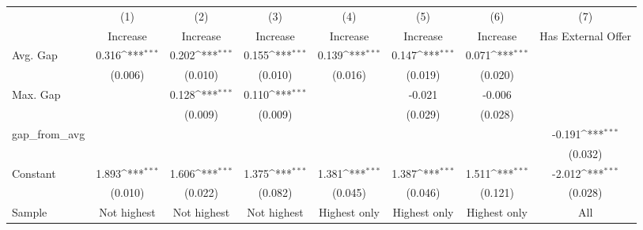 {
\def\sym#1{\ifmmode^{#1}\else\(^{#1}\)\fi}
\begin{tabular}{l*{7}{c}}
\hline\hline
                    &\multicolumn{1}{c}{(1)}&\multicolumn{1}{c}{(2)}&\multicolumn{1}{c}{(3)}&\multicolumn{1}{c}{(4)}&\multicolumn{1}{c}{(5)}&\multicolumn{1}{c}{(6)}&\multicolumn{1}{c}{(7)}\\
                    &\multicolumn{1}{c}{Increase}&\multicolumn{1}{c}{Increase}&\multicolumn{1}{c}{Increase}&\multicolumn{1}{c}{Increase}&\multicolumn{1}{c}{Increase}&\multicolumn{1}{c}{Increase}&\multicolumn{1}{c}{Has External Offer}\\
\hline
Avg. Gap            &       0.316\sym{***}&       0.202\sym{***}&       0.155\sym{***}&       0.139\sym{***}&       0.147\sym{***}&       0.071\sym{***}&                     \\
                    &     (0.006)         &     (0.010)         &     (0.010)         &     (0.016)         &     (0.019)         &     (0.020)         &                     \\
[1em]
Max. Gap            &                     &       0.128\sym{***}&       0.110\sym{***}&                     &      -0.021         &      -0.006         &                     \\
                    &                     &     (0.009)         &     (0.009)         &                     &     (0.029)         &     (0.028)         &                     \\
[1em]
gap\_from\_avg        &                     &                     &                     &                     &                     &                     &      -0.191\sym{***}\\
                    &                     &                     &                     &                     &                     &                     &     (0.032)         \\
[1em]
Constant            &       1.893\sym{***}&       1.606\sym{***}&       1.375\sym{***}&       1.381\sym{***}&       1.387\sym{***}&       1.511\sym{***}&      -2.012\sym{***}\\
                    &     (0.010)         &     (0.022)         &     (0.082)         &     (0.045)         &     (0.046)         &     (0.121)         &     (0.028)         \\
\hline
Sample              & Not highest         & Not highest         & Not highest         &Highest only         &Highest only         &Highest only         &         All         \\

\end{tabular}}
